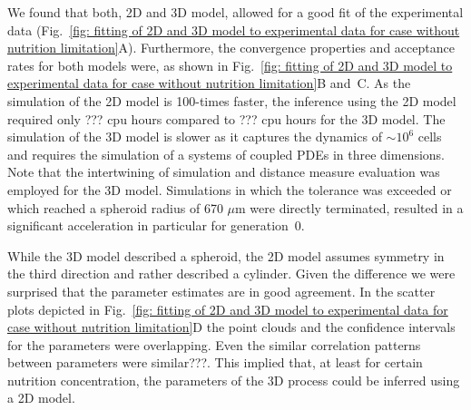 \documentclass[10pt,letterpaper]{article}
\newcommand{\jh}[1]{{\color{red}#1}}
\newcommand{\nj}[1]{{\color{blue}#1}}
\begin{document}
We found that both, 2D and 3D model, allowed for a good fit of the experimental data (Fig.~\ref{fig: fitting of 2D and 3D model to experimental data for case without nutrition limitation}A). Furthermore, the convergence properties and acceptance rates for both models were, as shown in Fig.~\ref{fig: fitting of 2D and 3D model to experimental data for case without nutrition limitation}B and~C. As the simulation of the 2D model is \nj{100-times} faster, the inference using the 2D model required only \jh{???} cpu hours compared to \jh{???} cpu hours for the 3D model. The simulation of the 3D model is slower as it captures the dynamics of \nj{$\sim10^6$ cells} and requires the simulation of a systems of coupled PDEs in three dimensions. Note that the intertwining of simulation and distance measure evaluation was employed for the 3D model. Simulations in which the tolerance was exceeded or which reached a spheroid radius of \nj{670 $\mu$m} were directly terminated, resulted in a significant acceleration in particular for generation~0.

While the 3D model described a spheroid, the 2D model assumes symmetry in the third direction and rather described a cylinder. Given the difference we were surprised that the parameter estimates are in good agreement. In the scatter plots depicted in Fig.~\ref{fig: fitting of 2D and 3D model to experimental data for case without nutrition limitation}D the point clouds and the confidence intervals for the parameters were overlapping. Even the similar correlation patterns between parameters were similar\jh{???}. This implied that, at least for certain nutrition concentration, the parameters of the 3D process could be inferred using a 2D model.
\end{document}

